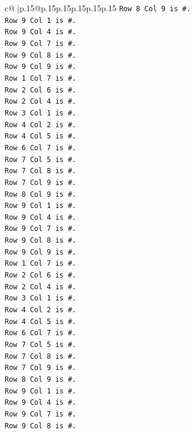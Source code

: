 \documentclass{article}
\begin{document}
{\begin{supertabular}{c@{$\;$}|p{.15\linewidth}@{}p{.15\linewidth}p{.15\linewidth}p{.15\linewidth}p{.15\linewidth}p{.15\linewidth}}
{{{\texttt{Row 8 Col 9 is \#.} \\
\texttt{Row 9 Col 1 is \#.} \\
\texttt{Row 9 Col 4 is \#.} \\
\texttt{Row 9 Col 7 is \#.} \\
\texttt{Row 9 Col 8 is \#.} \\
\texttt{Row 9 Col 9 is \#.} \\
\texttt{Row 1 Col 7 is \#.} \\
\texttt{Row 2 Col 6 is \#.} \\
\texttt{Row 2 Col 4 is \#.} \\
\texttt{Row 3 Col 1 is \#.} \\
\texttt{Row 4 Col 2 is \#.} \\
\texttt{Row 4 Col 5 is \#.} \\
\texttt{Row 6 Col 7 is \#.} \\
\texttt{Row 7 Col 5 is \#.} \\
\texttt{Row 7 Col 8 is \#.} \\
\texttt{Row 7 Col 9 is \#.} \\
\texttt{Row 8 Col 9 is \#.} \\
\texttt{Row 9 Col 1 is \#.} \\
\texttt{Row 9 Col 4 is \#.} \\
\texttt{Row 9 Col 7 is \#.} \\
\texttt{Row 9 Col 8 is \#.} \\
\texttt{Row 9 Col 9 is \#.} \\
\texttt{Row 1 Col 7 is \#.} \\
\texttt{Row 2 Col 6 is \#.} \\
\texttt{Row 2 Col 4 is \#.} \\
\texttt{Row 3 Col 1 is \#.} \\
\texttt{Row 4 Col 2 is \#.} \\
\texttt{Row 4 Col 5 is \#.} \\
\texttt{Row 6 Col 7 is \#.} \\
\texttt{Row 7 Col 5 is \#.} \\
\texttt{Row 7 Col 8 is \#.} \\
\texttt{Row 7 Col 9 is \#.} \\
\texttt{Row 8 Col 9 is \#.} \\
\texttt{Row 9 Col 1 is \#.} \\
\texttt{Row 9 Col 4 is \#.} \\
\texttt{Row 9 Col 7 is \#.} \\
\texttt{Row 9 Col 8 is \#.} \\
}}}
\end{supertabular}}
\end{document}
